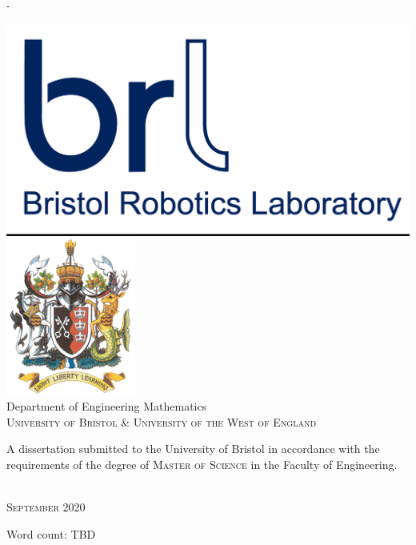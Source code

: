 \begin{titlingpage}
\begin{SingleSpace}
\begin{adjustwidth*}{\unitlength}{-\unitlength}
\begin{center}
\hspace{20mm}
\includegraphics[scale=0.1]{logos/BRL-SNI.png}
\hspace{20mm}
\includegraphics[scale=0.5]{logos/uweCrest.png}\\
\vspace{6mm}
{\large Department of Engineering Mathematics\\
\textsc{University of Bristol \& University of the West of England}}\\
\vspace{11mm}
\begin{minipage}{10cm}
A dissertation submitted to the University of Bristol in accordance with the requirements of the degree of \textsc{Master of Science} in the Faculty of Engineering.
\end{minipage}\\
\vspace{9mm}
{\large\textsc{September 2020}}
\vspace{12mm}
\end{center}
\begin{flushright}
{\small Word count: TBD}
\end{flushright}
\end{adjustwidth*}
\end{SingleSpace}
\end{titlingpage}